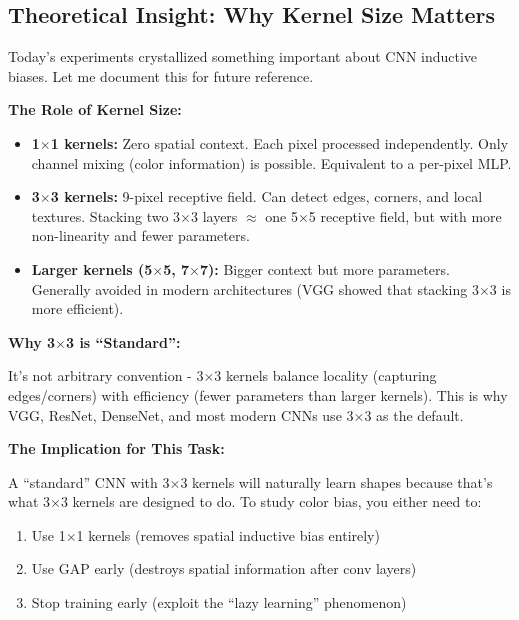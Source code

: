 \documentclass[9pt,a4paper,twocolumn,twoside]{tau-class/tau}
\begin{document}
    \subsection{Theoretical Insight: Why Kernel Size Matters}

        Today's experiments crystallized something important about CNN inductive biases. Let me document this for future reference.

        \textbf{The Role of Kernel Size:}

        \begin{itemize}
            \item \textbf{1$\times$1 kernels:} Zero spatial context. Each pixel processed independently. Only channel mixing (color information) is possible. Equivalent to a per-pixel MLP.

            \item \textbf{3$\times$3 kernels:} 9-pixel receptive field. Can detect edges, corners, and local textures. Stacking two 3$\times$3 layers $\approx$ one 5$\times$5 receptive field, but with more non-linearity and fewer parameters.

            \item \textbf{Larger kernels (5$\times$5, 7$\times$7):} Bigger context but more parameters. Generally avoided in modern architectures (VGG showed that stacking 3$\times$3 is more efficient).
        \end{itemize}

        \textbf{Why 3$\times$3 is ``Standard'':}

        It's not arbitrary convention - 3$\times$3 kernels balance locality (capturing edges/corners) with efficiency (fewer parameters than larger kernels). This is why VGG, ResNet, DenseNet, and most modern CNNs use 3$\times$3 as the default.

        \textbf{The Implication for This Task:}

        A ``standard'' CNN with 3$\times$3 kernels will naturally learn shapes because that's what 3$\times$3 kernels are designed to do. To study color bias, you either need to:
        \begin{enumerate}
            \item Use 1$\times$1 kernels (removes spatial inductive bias entirely)
            \item Use GAP early (destroys spatial information after conv layers)
            \item Stop training early (exploit the ``lazy learning'' phenomenon)
        \end{enumerate}
\end{document}
